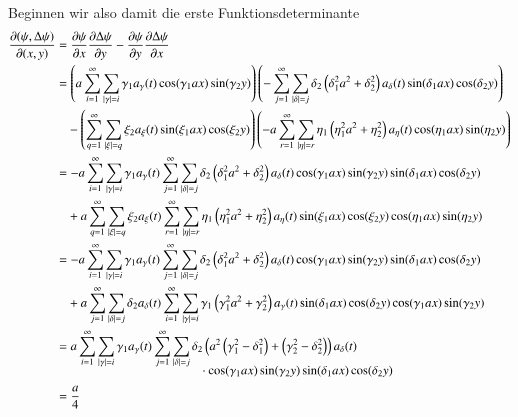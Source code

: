Beginnen wir also damit die erste Funktionsdeterminante
\begin{align*}
\frac{\partial(\psi, \laplace\psi)}{\partial(x,y)}
&=
\frac{\partial\psi}{\partial x}
\frac{\partial\laplace\psi}{\partial y}
-
\frac{\partial\psi}{\partial y}
\frac{\partial\laplace\psi}{\partial x}
\\
&=
\left(
a
\sum_{i = 1}^{\infty}
\sum_{|\gamma| = i}
\gamma_1
a_{\gamma}(t)
\cos(\gamma_1 ax) \sin(\gamma_2 y)
\right)
\left(
-
\sum_{j = 1}^{\infty}
\sum_{|\delta| = j}
\delta_2
\left(\delta_1^2 a^2 + \delta_2^2 \right)
a_{\delta}(t)
\sin(\delta_1 ax) \cos(\delta_2 y)
\right)
\\
&\phantom{={}}
-
\left(
\sum_{q = 1}^{\infty}
\sum_{|\xi| = q}
\xi_2
a_{\xi}(t)
\sin(\xi_1 ax) \cos(\xi_2 y)
\right)
\left(
-
a
\sum_{r = 1}^{\infty}
\sum_{|\eta| = r}
\eta_1
\left(\eta_1^2 a^2 + \eta_2^2 \right)
a_{\eta}(t)
\cos(\eta_1 ax) \sin(\eta_2 y)
\right)
\\
&=
-
a
\sum_{i = 1}^{\infty}
\sum_{|\gamma| = i}
\gamma_1
a_{\gamma}(t)
\sum_{j = 1}^{\infty}
\sum_{|\delta| = j}
\delta_2
\left(\delta_1^2 a^2 + \delta_2^2 \right)
a_{\delta}(t)
\cos(\gamma_1 ax) \sin(\gamma_2 y)
\sin(\delta_1 ax) \cos(\delta_2 y)
\\
&\phantom{={}}
+
a
\sum_{q = 1}^{\infty}
\sum_{|\xi| = q}
\xi_2
a_{\xi}(t)
\sum_{r = 1}^{\infty}
\sum_{|\eta| = r}
\eta_1
\left(\eta_1^2 a^2 + \eta_2^2 \right)
a_{\eta}(t)
\sin(\xi_1 ax) \cos(\xi_2 y)
\cos(\eta_1 ax) \sin(\eta_2 y)
\\
&=
-
a
\sum_{i = 1}^{\infty}
\sum_{|\gamma| = i}
\gamma_1
a_{\gamma}(t)
\sum_{j = 1}^{\infty}
\sum_{|\delta| = j}
\delta_2
\left(\delta_1^2 a^2 + \delta_2^2 \right)
a_{\delta}(t) 
\cos(\gamma_1 ax) \sin(\gamma_2 y)
\sin(\delta_1 ax) \cos(\delta_2 y)
\\
&\phantom{={}}
+
a
\sum_{j = 1}^{\infty}
\sum_{|\delta| = j}
\delta_2
a_{\delta}(t)
\sum_{i = 1}^{\infty}
\sum_{|\gamma| = i}
\gamma_1
\left(\gamma_1^2 a^2 + \gamma_2^2 \right)
a_{\gamma}(t)
\sin(\delta_1 ax) \cos(\delta_2 y)
\cos(\gamma_1 ax) \sin(\gamma_2 y)
\\
&=
a
\sum_{i = 1}^{\infty}
\sum_{|\gamma| = i}
\gamma_1
a_{\gamma}(t)
\sum_{j = 1}^{\infty}
\sum_{|\delta| = j}
\delta_2
\left(
a^2 \left(\gamma_1^2 - \delta_1^2 \right)
+ \left(\gamma_2^2 - \delta_2^2 \right)
\right)
a_{\delta}(t)
\\[-2ex]
&\phantom{=abbbbb\sum\sum.....{}ccccccc}
\cdot
\cos(\gamma_1 ax) \sin(\gamma_2 y)
\sin(\delta_1 ax) \cos(\delta_2 y)
\\
&=
\frac{a}{4}

\end{align*}
